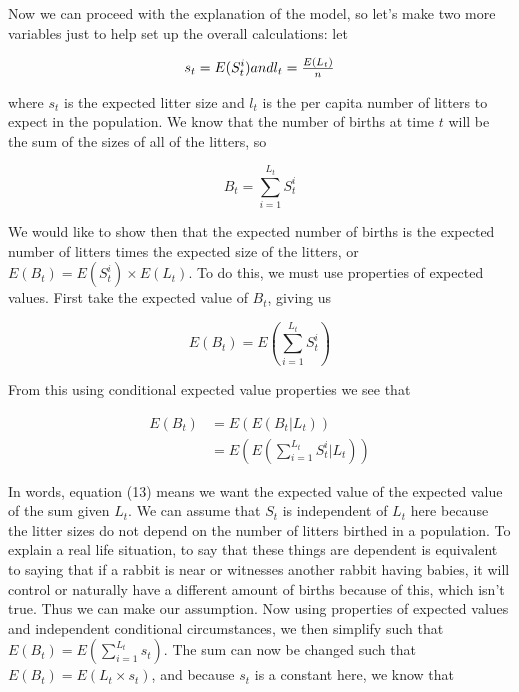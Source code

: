 \documentclass{article}\usepackage[]{graphicx}\usepackage[]{color}
\begin{document}
Now we can proceed with the explanation of the model, so let's make two more variables just to help set up the overall calculations: let 

\begin{equation}
s_t = E(S_t^i)$$ and $$l_t = \frac{E(L_t)}{n}
\end{equation}

\noindent where \(s_t\) is the expected litter size and \(l_t\) is the per capita number of litters to expect in the population. We know that the number of births at time \(t\) will be the sum of the sizes of all of the litters, so 

\begin{equation}
B_t = \sum_{i=1}^{L_t} S_t^i 
\end{equation}

We would like to show then that the expected number of births is the expected number of litters times the expected size of the litters, or \(E(B_t) = E(S_t^i)\times E(L_t)\). To do this, we must use properties of expected values. First take the expected value of \(B_t\), giving us 

\begin{equation}
E(B_t) = E\left(\sum_{i=1}^{L_t} S_t^i\right)
\end{equation}

\noindent From this using conditional expected value properties we see that 

\begin{equation}
\begin{split}
E(B_t) & = E(E(B_t | L_t)) \\
& = E\left(E\left(\sum_{i=1}^{L_t} S_t^i | L_t\right)\right)
\end{split}
\end{equation}

\noindent In words, equation (13) means we want the expected value of the expected value of the sum given \(L_t\). We can assume that \(S_t\) is independent of \(L_t\) here because the litter sizes do not depend on the number of litters birthed in a population. To explain a real life situation, to say that these things are dependent is equivalent to saying that if a rabbit is near or witnesses another rabbit having babies, it will control or naturally have a different amount of births because of this, which isn't true. Thus we can make our assumption. Now using properties of expected values and independent conditional circumstances, we then simplify such that \(E(B_t) = E(\sum_{i=1}^{L_t} s_t)\). The sum can now be changed such that \(E(B_t) = E(L_t \times s_t)\), and because \(s_t\) is a constant here, we know that 
\end{document}
